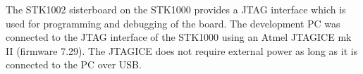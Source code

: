 The STK1002 sisterboard on the STK1000 provides a JTAG interface which is used for programming and debugging of the board.
The development PC was connected to the JTAG interface of the STK1000 using an Atmel JTAGICE mk II (firmware 7.29).
The JTAGICE does not require external power as long as it is connected to the PC over USB.
